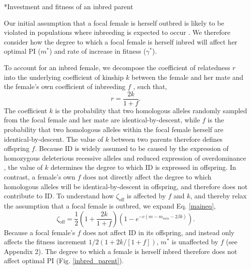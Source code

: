 \documentclass[12pt]{article}
\makeatletter
\renewcommand\subsection{\@startsection{subsection}{1}{-0.25in}{-0.5\baselineskip}{0.1\baselineskip}{\normalfont\normalsize\bfseries\textit}}
\makeatother
\begin{document}
\subsection*{Investment and fitness of an inbred parent}

Our initial assumption that a focal female is herself outbred is likely to be violated in populations where inbreeding is expected to occur \cite[][]{Duthie2015a}. We therefore consider how the degree to which a focal female is herself inbred will affect her optimal PI ($m^{*}$) and rate of increase in fitness ($\gamma^{*}$).

To account for an inbred female, we decompose the coefficient of relatedness $r$ into the underlying coefficient of kinship $k$ between the female and her mate and the female's own coefficient of inbreeding $f$ \cite[see][]{Hamilton1972, Michod1979}, such that,
\begin{equation} \label{rdef}
r = \frac{2k}{1 + f}.
\end{equation} %
The coefficient $k$ is the probability that two homologous alleles randomly sampled from the focal female and her mate are identical-by-descent, while $f$ is the probability that two homologous alleles within the focal female herself are identical-by-descent. The value of $k$ between two parents therefore defines offspring $f$. Because ID is widely assumed to be caused by the expression of homozygous deleterious recessive alleles and reduced expression of overdominance \cite[][]{Charlesworth2009}, the value of $k$ determines the degree to which ID is expressed in offspring. In contrast, a female's own $f$ does not directly affect the degree to which homologous alleles will be identical-by-descent in offspring, and therefore does not contribute to ID. To understand how $\zeta_{\textrm{off}}$ is affected by $f$ and $k$, and thereby relax the assumption that a focal female is outbred, we expand Eq. \ref{maineq},
\begin{equation} \label{maineqr}
\zeta_{\textrm{off}} = \frac{1}{2}\left(1+\frac{2k}{1+f}\right)\left(1-e^{-c\left(m-m_{min}-2\beta k\right)}\right).
\end{equation}
Because a focal female's $f$ does not affect ID in its offspring, and instead only affects the fitness increment $1/2\left(1+ 2 k / \left[1 + f\right]\right)$, $m^{*}$ is unaffected by $f$  (see Appendix 2). The degree to which a female is herself inbred therefore does not affect optimal PI (Fig. \ref{inbred_parent}). 
\end{document}
